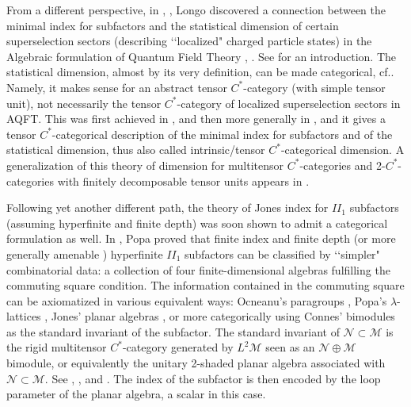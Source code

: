 \documentclass[11pt,a4paper]{article}
\makeatletter
\newcommand{\M}{\mathcal{M}}
\newcommand{\N}{\mathcal{N}}
\def\II{{I\!I}}%
\newcommand{\lqq}{\lq\lq}
\DeclareRobustCommand{\cf}{cf.\@\xspace}
\DeclareRobustCommand{\Sec}{Sec.\@\xspace}
\newcommand{\Cstar}{$C^\ast$\@\xspace}
\theoremstyle{plain}
\theoremstyle{definition}
\theoremstyle{remark}
\numberwithin{equation}{section}%
\makeatother
\begin{document}
From a different perspective, in \cite{Lon89}, \cite{Lon90}, Longo discovered a connection between the minimal index for subfactors and the statistical dimension of certain superselection sectors (describing \lqq localized" charged particle states) in the Algebraic formulation of Quantum Field Theory \cite{DHR71}, \cite{DHR74}. 
See \cite{HaagBook} for an introduction. The statistical dimension, almost by its very definition, can be made categorical, \cf \cite[\Sec III]{DHR74}.
Namely, it makes sense for an abstract tensor \Cstar-category (with simple tensor unit), not necessarily the tensor \Cstar-category of localized superselection sectors in AQFT. This was first achieved in \cite{DoRo89}, and then more generally in \cite{LoRo97}, and it gives a tensor \Cstar-categorical description of the minimal index for subfactors and of the statistical dimension, thus also called intrinsic/tensor \Cstar-categorical dimension. 
A generalization of this theory of dimension for multitensor \Cstar-categories and 2-\Cstar-categories with finitely decomposable tensor units appears in \cite{GiLo19}.

Following yet another different path, the theory of Jones index for $\II_1$ subfactors (assuming hyperfinite and finite depth) was soon shown to admit a categorical formulation as well. In \cite{Pop90}, Popa proved that finite index and finite depth (or more generally amenable \cite{Pop94}) hyperfinite $\II_1$ subfactors can be classified by \lqq simpler" combinatorial data: a collection of four finite-dimensional algebras fulfilling the commuting square condition. The information contained in the commuting square can be axiomatized in various equivalent ways: Ocneanu's paragroups \cite{Ocn88}, Popa's $\lambda$-lattices \cite{Pop95}, Jones' planar algebras \cite{Jon99}, or more categorically using Connes' bimodules \cite{Bis97} as the standard invariant of the subfactor. The standard invariant of $\N\subset\M$ is the rigid multitensor \Cstar-category generated by $L^2\M$ seen as an $\N\oplus\M$ bimodule, or equivalently the unitary 2-shaded planar algebra associated with $\N\subset\M$. See \cite{MPS10}, \cite{Gho11}, \cite{BHP12} and \cite{BCEGP20}.
The index of the subfactor is then encoded by the loop parameter of the planar algebra, a scalar in this case.
\end{document}
